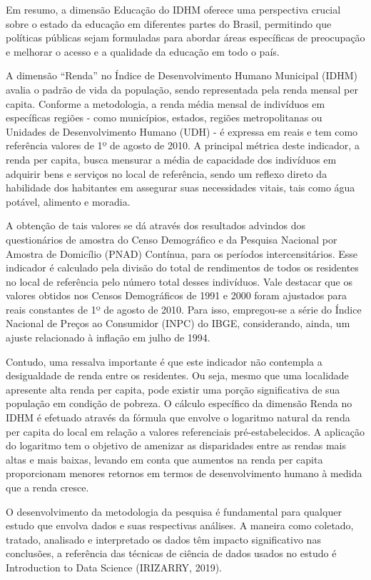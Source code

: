 \documentclass[
]{article}
\begin{document}
Em resumo, a dimensão Educação do IDHM oferece uma perspectiva crucial
sobre o estado da educação em diferentes partes do Brasil, permitindo
que políticas públicas sejam formuladas para abordar áreas específicas
de preocupação e melhorar o acesso e a qualidade da educação em todo o
país.

A dimensão ``Renda'' no Índice de Desenvolvimento Humano Municipal
(IDHM) avalia o padrão de vida da população, sendo representada pela
renda mensal per capita. Conforme a metodologia, a renda média mensal de
indivíduos em específicas regiões - como municípios, estados, regiões
metropolitanas ou Unidades de Desenvolvimento Humano (UDH) - é expressa
em reais e tem como referência valores de 1º de agosto de 2010. A
principal métrica deste indicador, a renda per capita, busca mensurar a
média de capacidade dos indivíduos em adquirir bens e serviços no local
de referência, sendo um reflexo direto da habilidade dos habitantes em
assegurar suas necessidades vitais, tais como água potável, alimento e
moradia.

A obtenção de tais valores se dá através dos resultados advindos dos
questionários de amostra do Censo Demográfico e da Pesquisa Nacional por
Amostra de Domicílio (PNAD) Contínua, para os períodos intercensitários.
Esse indicador é calculado pela divisão do total de rendimentos de todos
os residentes no local de referência pelo número total desses
indivíduos. Vale destacar que os valores obtidos nos Censos Demográficos
de 1991 e 2000 foram ajustados para reais constantes de 1º de agosto de
2010. Para isso, empregou-se a série do Índice Nacional de Preços ao
Consumidor (INPC) do IBGE, considerando, ainda, um ajuste relacionado à
inflação em julho de 1994.

Contudo, uma ressalva importante é que este indicador não contempla a
desigualdade de renda entre os residentes. Ou seja, mesmo que uma
localidade apresente alta renda per capita, pode existir uma porção
significativa de sua população em condição de pobreza. O cálculo
específico da dimensão Renda no IDHM é efetuado através da fórmula que
envolve o logaritmo natural da renda per capita do local em relação a
valores referenciais pré-estabelecidos. A aplicação do logaritmo tem o
objetivo de amenizar as disparidades entre as rendas mais altas e mais
baixas, levando em conta que aumentos na renda per capita proporcionam
menores retornos em termos de desenvolvimento humano à medida que a
renda cresce.

O desenvolvimento da metodologia da pesquisa é fundamental para qualquer
estudo que envolva dados e suas respectivas análises. A maneira como
coletado, tratado, analisado e interpretado os dados têm impacto
significativo nas conclusões, a referência das técnicas de ciência de
dados usados no estudo é Introduction to Data Science (IRIZARRY, 2019).
\end{document}

